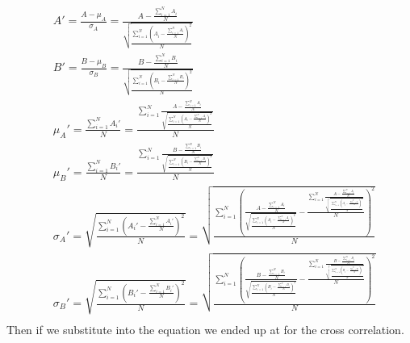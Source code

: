\documentclass[12pt, a4paper]{article}
\begin{document}
\begin{equation*}
    \begin{split}
        & A'=\frac{A-\mu_A}{\sigma_A}=\frac{A-\frac{\sum_{i=1}^{N}{A_i}}{N}}{\sqrt{\frac{\sum_{i=1}^{N}{\left(A_i-\frac{\sum_{i=1}^{N}{A_i}}{N}\right)^2}}{N}}} \\
        & B'=\frac{B-\mu_B}{\sigma_B}=\frac{B-\frac{\sum_{i=1}^{N}{B_i}}{N}}{\sqrt{\frac{\sum_{i=1}^{N}{\left(B_i-\frac{\sum_{i=1}^{N}{B_i}}{N}\right)^2}}{N}}} \\
        & \mu_A' = \frac{\sum_{i=1}^{N}{A_i'}}{N} = \frac{\sum_{i=1}^{N}{\frac{A-\frac{\sum_{i=1}^{N}{A_i}}{N}}{\sqrt{\frac{\sum_{i=1}^{N}{\left(A_i-\frac{\sum_{i=1}^{N}{A_i}}{N}\right)^2}}{N}}}}}{N} \\
        & \mu_B' = \frac{\sum_{i=1}^{N}{B_i'}}{N} = \frac{\sum_{i=1}^{N}{\frac{B-\frac{\sum_{i=1}^{N}{B_i}}{N}}{\sqrt{\frac{\sum_{i=1}^{N}{\left(B_i-\frac{\sum_{i=1}^{N}{B_i}}{N}\right)^2}}{N}}}}}{N} \\
        & \sigma_A' = \sqrt{\frac{\sum_{i=1}^{N}{\left(A_i'-\frac{\sum_{i=1}^{N}{A_i'}}{N}\right)^2}}{N}} = \sqrt{\frac{\sum_{i=1}^{N}{\left(\frac{A-\frac{\sum_{i=1}^{N}{A_i}}{N}}{\sqrt{\frac{\sum_{i=1}^{N}{\left(A_i-\frac{\sum_{i=1}^{N}{A_i}}{N}\right)^2}}{N}}}-\frac{\sum_{i=1}^{N}{\frac{A-\frac{\sum_{i=1}^{N}{A_i}}{N}}{\sqrt{\frac{\sum_{i=1}^{N}{\left(A_i-\frac{\sum_{i=1}^{N}{A_i}}{N}\right)^2}}{N}}}}}{N}\right)^2}}{N}} \\
        & \sigma_B' = \sqrt{\frac{\sum_{i=1}^{N}{\left(B_i'-\frac{\sum_{i=1}^{N}{B_i'}}{N}\right)^2}}{N}} = \sqrt{\frac{\sum_{i=1}^{N}{\left(\frac{B-\frac{\sum_{i=1}^{N}{B_i}}{N}}{\sqrt{\frac{\sum_{i=1}^{N}{\left(B_i-\frac{\sum_{i=1}^{N}{B_i}}{N}\right)^2}}{N}}}-\frac{\sum_{i=1}^{N}{\frac{B-\frac{\sum_{i=1}^{N}{B_i}}{N}}{\sqrt{\frac{\sum_{i=1}^{N}{\left(B_i-\frac{\sum_{i=1}^{N}{B_i}}{N}\right)^2}}{N}}}}}{N}\right)^2}}{N}} \\
    \end{split}
\end{equation*}
Then if we substitute into the equation we ended up at for the cross correlation.
\end{document}
